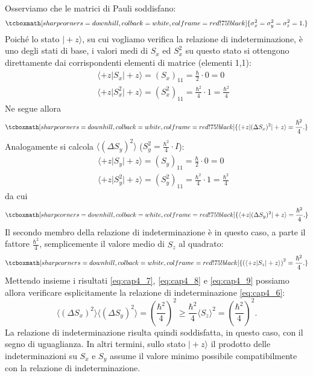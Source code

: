 \documentclass[a4paper,12pt,oneside]{book}
\begin{document}
Osserviamo che le matrici di Pauli soddisfano:
	\begin{equation}
		\tcboxmath[sharp corners=downhill ,colback=white,colframe=red!75!black]{
		\sigma _x ^2 = \sigma _y ^2 = \sigma _z ^2 =1.
		}
	\end{equation}
Poiché lo stato $\vert +z \rangle$, su cui vogliamo verifica la relazione di indeterminazione, è uno degli stati di base, i valori medi di $S_x$ ed $S_x ^2$ su questo stato si ottengono direttamente dai corrispondenti elementi di matrice (elementi 1,1):
	\begin{eqnarray}
		& &\displaystyle{\langle +z \vert S_x \vert +z \rangle = (S_x)_{11} = \frac{\hbar}{2}\cdot 0 =0}  \\
		& &\displaystyle{\langle +z \vert S_x ^2\vert +z \rangle = (S_x ^2)_{11} = \frac{\hbar ^2}{4}\cdot 1 =\frac{\hbar ^2}{4}} 
	\end{eqnarray}
Ne segue allora
	\begin{equation}
		\label{eq:cap4_7}
		\tcboxmath[sharp corners=downhill ,colback=white,colframe=red!75!black]{
			\langle +z \vert (\Delta S_x)^2\vert +z \rangle = \frac{\hbar ^2}{4}.
			}
	\end{equation}
Analogamente si calcola $\langle (\Delta S_y)^2 \rangle $ ($S_y ^2= \frac{\hbar ^2}{4}\cdot I$):
	\begin{eqnarray}
	& &\displaystyle{\langle +z \vert S_y \vert +z \rangle = (S_y)_{11} = \frac{\hbar}{2}\cdot 0 =0}  \\
	& &\displaystyle{\langle +z \vert S_y ^2\vert +z \rangle = (S_y ^2)_{11} = \frac{\hbar ^2}{4}\cdot 1 =\frac{\hbar ^2}{4}} \nonumber
	\end{eqnarray}
da cui
	\begin{equation}
		\label{eq:cap4_8}
		\tcboxmath[sharp corners=downhill ,colback=white,colframe=red!75!black]{
			\langle +z \vert (\Delta S_y)^2\vert +z \rangle = \frac{\hbar ^2}{4}.
			}
	\end{equation}
Il secondo membro della relazione di indeterminazione è in questo caso, a parte il fattore $\frac{\hbar ^2}{4}$, semplicemente il valore medio di $S_z$ al quadrato:
	\begin{equation}
		\label{eq:cap4_9}
		\tcboxmath[sharp corners=downhill ,colback=white,colframe=red!75!black]{
			\left( \langle +z \vert S_z \vert +z \rangle \right) ^2 = \frac{\hbar ^2}{4}.
			}
	\end{equation}
Mettendo insieme i risultati \eqref{eq:cap4_7}, \eqref{eq:cap4_8} e \eqref{eq:cap4_9} possiamo allora verificare esplicitamente la relazione di indeterminazione \eqref{eq:cap4_6}:
	\begin{equation}
		\langle  (\Delta S_x)^2 \rangle \langle(\Delta S_y)^2 \rangle = \left(\frac{\hbar ^2}{4} \right) ^2 \geq \frac{\hbar ^2}{4} \langle S_z  \rangle ^2 = \left(\frac{\hbar ^2}{4} \right) ^2.
	\end{equation}
La relazione di indeterminazione risulta quindi soddisfatta, in questo caso, con il segno di uguaglianza. In altri termini, sullo stato $\vert +z \rangle $ il prodotto delle indeterminazioni su $S_x$ e $S_y$ assume il valore minimo possibile compatibilmente con la relazione di indeterminazione.\\ \\
\end{document}
